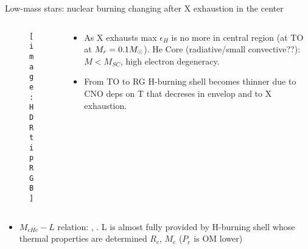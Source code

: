 \begin{frame} {Low-mass stars: nuclear burning changing after X exhaustion in the center}
\begin{columns}[T]\begin{column}{0.5\textwidth}
\begin{figure}[!ht]
\texttt{[image: HDRtipRGB]}\label{fig:HDRtipRGB}
\end{figure}
\end{column}
\begin{column}{0.4\textwidth}
\begin{itemize}
\item As X exhausts max $\epsilon_H$ is no more in central region (at TO at $M_r=0.1M_{\odot}{}$). He Core (radiative/small convective??): $M<M_{SC}$, high electron degeneracy.
\item From TO to RG H-burning shell becomes thinner due to CNO deps on T that decreses in envelop and to X exhaustion.
\end{itemize}
\end{column}\end{columns}
\begin{itemize}
\item $M_{cHe}-L$ relation: , . L is almost fully provided by H-burning shell whose thermal properties are determined $R_c$, $M_c$ ($P_e$ is OM lower)
\end{itemize}
\end{frame}

